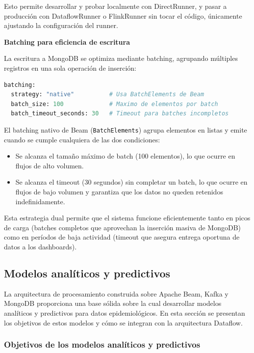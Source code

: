 \documentclass[12pt,a4paper]{article}
\begin{document}
Esto permite desarrollar y probar localmente con DirectRunner, y pasar a producción con DataflowRunner o FlinkRunner sin tocar el código, únicamente ajustando la configuración del runner.

\textbf{Batching para eficiencia de escritura}

La escritura a MongoDB se optimiza mediante batching, agrupando múltiples registros en una sola operación de inserción:

\begin{lstlisting}[language=Python, caption=Configuración de batching en config.yaml]
batching:
  strategy: "native"          # Usa BatchElements de Beam
  batch_size: 100             # Maximo de elementos por batch
  batch_timeout_seconds: 30   # Timeout para batches incompletos
\end{lstlisting}

El batching nativo de Beam (\texttt{BatchElements}) agrupa elementos en listas y emite cuando se cumple cualquiera de las dos condiciones:

\begin{itemize}
    \item Se alcanza el tamaño máximo de batch (100 elementos), lo que ocurre en flujos de alto volumen.
    \item Se alcanza el timeout (30 segundos) sin completar un batch, lo que ocurre en flujos de bajo volumen y garantiza que los datos no queden retenidos indefinidamente.
\end{itemize}

Esta estrategia dual permite que el sistema funcione eficientemente tanto en picos de carga (batches completos que aprovechan la inserción masiva de MongoDB) como en períodos de baja actividad (timeout que asegura entrega oportuna de datos a los dashboards).

\subsection{Modelos analíticos y predictivos}\label{modelos-analuxedticos-y-predictivos}

La arquitectura de procesamiento construida sobre Apache Beam, Kafka y MongoDB proporciona una base sólida sobre la cual desarrollar modelos analíticos y predictivos para datos epidemiológicos. En esta sección se presentan los objetivos de estos modelos y cómo se integran con la arquitectura Dataflow.

\subsubsection{Objetivos de los modelos analíticos y predictivos}
\end{document}
